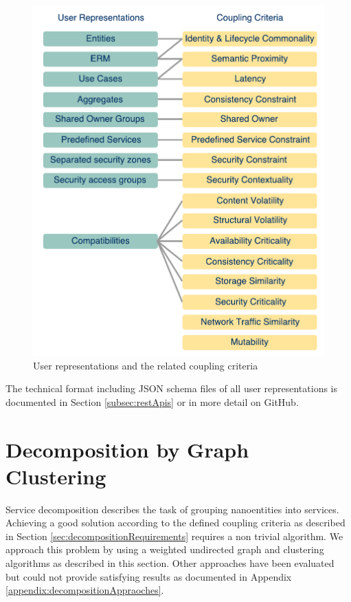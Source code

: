  \begin{figure}[H]
 	\begin{center}
 		\includegraphics[scale=0.6]{diagrams/UserRep-CC.pdf}
 		\caption{User representations and the related coupling criteria}
 		\label{fig:userrep}
 	\end{center}
 \end{figure}
 
 The technical format including \gls{JSON} schema files of all user representations is documented in Section \ref{subsec:restApis} or in more detail on GitHub\cite{githubWiki}. 
 
 
\section{Decomposition by Graph Clustering}
\label{subsec:approach1_graph}

Service decomposition describes the task of grouping nanoentities into services. Achieving a good solution according to the defined coupling criteria as described in Section \ref{sec:decompositionRequirements} requires a non trivial algorithm. We approach this problem by using a weighted undirected graph and clustering algorithms as described in this section. Other approaches have been evaluated but could not provide satisfying results as documented in Appendix \ref{appendix:decompositionAppraoches}.

